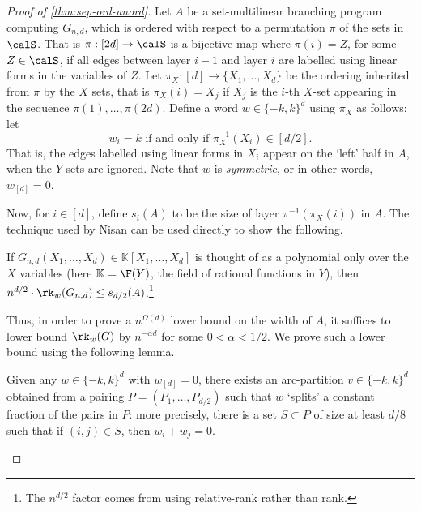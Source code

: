 \documentclass{article}
\begin{document}
\begin{proof}[Proof of \autoref{thm:sep-ord-unord}]
    Let $A$ be a set-multilinear branching program computing $G_{n,d}$, which is ordered with respect to a permutation $\pi$ of the sets in $\calS$.
    That is $\pi: [2d]\rightarrow \calS$ is a bijective map where $\pi(i) = Z$, for some $Z\in \calS$, if all edges between layer $i-1$ and layer $i$ are labelled using linear forms in the variables of $Z$. 
    Let $\pi_X:[d]\rightarrow \{X_1,\ldots,X_d\}$ be the ordering inherited from $\pi$ by the $X$ sets, that is $\pi_X(i) = X_j$ if $X_j$ is the $i$-th $X$-set appearing in the sequence $\pi(1),\ldots,\pi(2d)$. 
    Define a word $w\in \{-k,k\}^d$ using $\pi_X$ as follows: let 
    \[
        w_i = k \text{ if and only if } \pi_X^{-1}(X_i)\in [d/2].
    \] 
    That is, the edges labelled using linear forms in $X_i$ appear on the `left' half in $A$, when the $Y$ sets are ignored. 
    Note that $w$ is \emph{symmetric}, or in other words, $w_{[d]} = 0$.

    Now, for $i\in[d]$, define $s_i(A)$ to be the size of layer $\pi^{-1}(\pi_X(i))$ in $A$.
    The technique used by Nisan \cite{Nisan91} can be used directly to show the following.

    \begin{lem}\label{lem:nisan-abpsize}
        If $G_{n,d}(X_1,\ldots,X_d)\in \mathbb{K}[X_1,\ldots,X_d]$ is thought of as a polynomial only over the $X$ variables (here $\mathbb{K} = \F(Y)$, the field of rational functions in $Y$), then $n^{d/2}\cdot \rk_w(G_{n,d})\leq s_{d/2}(A)$.\footnote{The $n^{d/2}$ factor comes from using relative-rank rather than rank.}
    \end{lem}

    Thus, in order to prove a $n^{\Omega(d)}$ lower bound on the width of $A$, it suffices to lower bound $\rk_w(G)$ by $n^{-\alpha d}$ for some $0 < \alpha < 1/2$.
    We prove such a lower bound using the following lemma.

    \begin{lem}\label{lem:overlap}
        Given any $w\in\{-k,k\}^d$ with $w_{[d]} = 0$, there exists an arc-partition $v\in\{-k,k\}^d$ obtained from a pairing $P = (P_1,\ldots,P_{d/2})$ such that $w$ `splits' a constant fraction of the pairs in $P$: more precisely, there is a set $S\subset P$ of size at least $d/8$ such that if $(i,j) \in S$, then $w_i + w_j = 0$.
    \end{lem}


\end{proof}
\end{document}
